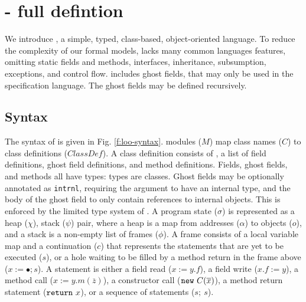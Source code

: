 
\section{\LangOO - full defintion}
\label{app:loo}


We introduce \LangOO, a simple, typed, class-based, object-oriented language.
To reduce the complexity of our formal models, \LangOO lacks many
common languages features, omitting static fields and methods, interfaces,
inheritance, subsumption, exceptions, and control flow.  
 \LangOO includes ghost fields,  that may only be used in the specification language.
The ghost fields may be defined recursively.
%


\subsection{Syntax}
The syntax of \LangOO is given in Fig. \ref{f:loo-syntax}.
\LangOO modules ($M$) map class names ($C$) to class definitions ($\textit{ClassDef}$).
A class definition consists of ,
a list of field definitions, ghost field definitions, and method definitions.
{Fields, ghost fields, and methods all have types: {types are
    classes}. Ghost fields may be optionally 
annotated as \texttt{intrnl}, requiring the argument to have an internal type, and the 
body of the ghost field to only contain references to internal objects. This is enforced by the
limited type system of \LangOO.}
A program state ($\sigma$) is represented as a heap ($\chi$), stack ($\psi$) pair, 
where a heap is a map from addresses ($\alpha$) to objects ($o$), and a stack is a non-empty list of frames ($\phi$). A frame consists of a local variable
map and a continuation ($c$) that represents the statements that are yet to be executed ($s$),
or a hole waiting to be filled by a method return in the frame above ($x := \bullet; s$).
A statement is either a field read ($x := y.f$), a field write ($x.f := y$), a method call
($x := y.m(\overline{z})$), a constructor call ($\prg{new}\ C(\overline{x})$), a method return statement
($\mbox{\normalfont{\texttt{return}}}\ x$), or a sequence of statements ($s;\ s$).

